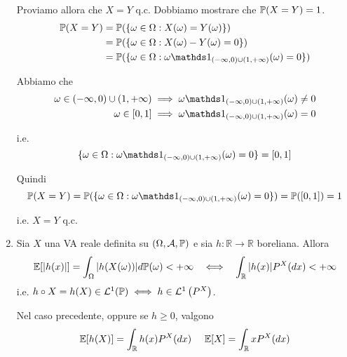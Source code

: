 \begin{enumerate}
Proviamo allora che $X=Y$ q.c. Dobbiamo mostrare che $\mathbb{P}( X=Y) =1$.\begin{equation*}
\begin{aligned}
\PP( X=Y) & =\PP(\{\omega \in \Omega :X( \omega ) =Y( \omega )\})\\
 & =\PP(\{\omega \in \Omega :X( \omega ) -Y( \omega ) =0\})\\
 & =\PP(\{\omega \in \Omega :\omega \Ind_{( -\infty ,0) \cup ( 1,+\infty )}( \omega ) =0\})
\end{aligned}
\end{equation*}

Abbiamo che\begin{equation*}
\begin{aligned}
\omega \in ( -\infty ,0) \cup ( 1,+\infty ) & \implies \omega \Ind_{( -\infty ,0) \cup ( 1,+\infty )}( \omega ) \neq 0\\
\omega \in [ 0,1] & \implies \omega \Ind_{( -\infty ,0) \cup ( 1,+\infty )}( \omega ) =0
\end{aligned}
\end{equation*}

i.e.\begin{equation*}
\{\omega \in \Omega :\omega \Ind_{( -\infty ,0) \cup ( 1,+\infty )}( \omega ) =0\} =[ 0,1]
\end{equation*}

Quindi\begin{equation*}
\PP( X=Y) =\PP(\{\omega \in \Omega :\omega \Ind_{( -\infty ,0) \cup ( 1,+\infty )}( \omega ) =0\}) =\PP([ 0,1]) =1
\end{equation*}

i.e. $X=Y$ q.c.
\item \begin{theorem}
Sia $X$ una VA reale definita su $( \Omega ,\mathcal{A} ,\mathbb{P})$ e sia $h:\mathbb{R}\rightarrow \mathbb{R}$ boreliana. Allora
\begin{equation*}
\EE[| h( x)| ] =\int _{\Omega }| h( X( \omega ))| d\PP( \omega ) < +\infty \ \ \iff \ \ \int _{\mathbb{R}}| h( x)| P^{X}( dx) < +\infty 
\end{equation*}
i.e. $h\circ X=h( X) \in \mathcal{L}^{1}(\mathbb{P}) \iff h\in \mathcal{L}^{1}\left( P^{X}\right)$.

Nel caso precedente, oppure se $h\geq 0$, valgono\begin{equation*}
\mathbb{E}[ h( X)] =\int _{\mathbb{R}} h( x) P^{X}( dx) \ \ \ \ \mathbb{E}[ X] =\int _{\mathbb{R}} xP^{X}( dx)
\end{equation*}


\end{theorem}
\end{enumerate}
